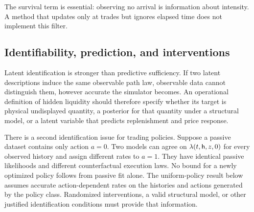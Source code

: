 The survival term is essential: observing no arrival is information about intensity. A method that updates only at trades but ignores elapsed time does not implement this filter.

\subsection{Identifiability, prediction, and interventions}
Latent identification is stronger than predictive sufficiency. If two latent descriptions induce the same observable path law, observable data cannot distinguish them, however accurate the simulator becomes. An operational definition of hidden liquidity should therefore specify whether its target is physical undisplayed quantity, a posterior for that quantity under a structural model, or a latent variable that predicts replenishment and price response.

There is a second identification issue for trading policies. Suppose a passive dataset contains only action $a=0$. Two models can agree on
$\lambda(t,\mathsf h,z,0)$ for every observed history and assign different rates to $a=1$. They have identical passive likelihoods and different counterfactual execution laws. No bound for a newly optimized policy follows from passive fit alone. The uniform-policy result below assumes accurate action-dependent rates on the histories and actions generated by the policy class. Randomized interventions, a valid structural model, or other justified identification conditions must provide that information.

